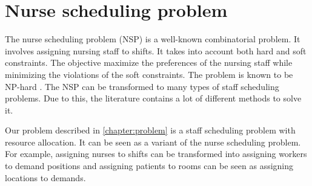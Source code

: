 \documentclass[../../thesis.tex]{subfiles}
\begin{document}
\section{Nurse scheduling problem}

The nurse scheduling problem (NSP) is a well-known combinatorial problem.
It involves assigning nursing staff to shifts. It takes into account 
both hard and soft constraints. The objective maximize the preferences 
of the nursing staff while minimizing the violations of the soft constraints.
The problem is known to be NP-hard \cite{Osogami2000}.
The NSP can be transformed to many types of staff scheduling problems. 
Due to this, the literature contains a lot of different methods to solve it.

Our problem described in \autoref{chapter:problem} is a staff scheduling problem with resource allocation. 
It can be seen as a variant of the nurse scheduling problem. For example, assigning nurses to shifts can be 
transformed into assigning workers to demand positions and assigning patients to rooms can be 
seen as assigning locations to demands.
\end{document}
